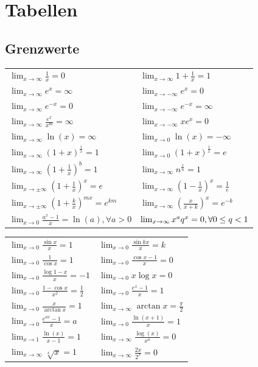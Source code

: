 \documentclass[a4paper,fontsize = 7pt]{scrartcl}
\renewcommand*{\arraystretch}{2}
\def\limxo{\lim_{x\to 0}}
\def\limxi{\lim_{x\to\infty}}
\def\limxn{\lim_{x\to-\infty}}
\begin{document}
\section{Tabellen}
\subsection{Grenzwerte}
\arraycolsep=1pt\def\arraystretch{1.5}
\begin{center}
  \begin{tabularx}{\linewidth}{XX}
    \toprule
    $\limxi \frac{1}{x} = 0$ & $\limxi 1 + \frac{1}{x} = 1$ \\
    $\limxi e^x = \infty$ & $\limxn e^x = 0$ \\
    $\limxi e^{-x} = 0$ & $\limxn e^{-x} = \infty$ \\
    $\limxi \frac{e^x}{x^m} = \infty$ & $\limxn xe^x = 0$ \\
    $\limxi \ln(x) = \infty$ & $\limxo \ln(x) = -\infty$ \\
    $\limxi (1+x)^{\frac{1}{x}} = 1$ & $\limxo (1+x)^{\frac{1}{x}} = e$ \\
    $\limxi (1+\frac{1}{x})^b = 1$ & $\limxi n^{\frac{1}{n}} = 1$ \\
    $\lim_{x\to\pm\infty} (1 + \frac{1}{x})^x = e$ & $\limxi (1-\frac{1}{x})^x = \frac{1}{e}$ \\
    $\lim_{x\to\pm\infty} (1 + \frac{k}{x})^{mx} = e^{km}$ & $\limxi (\frac{x}{x+k})^x = e^{-k}$ \\
    $\limxo \frac{a^x -1}{x} = \ln(a), \forall a > 0$ &
    $\limxi x^a q^x = 0, \newline \forall 0 \le q < 1$ \\
  \end{tabularx}
  \begin{tabularx}{\linewidth}{XX}
    $\limxo \frac{\sin x}{x} = 1$ & $\limxo \frac{\sin kx}{x} = k$\\
    $\limxo \frac{1}{\cos x} = 1$ & $\limxo \frac{\cos x -1}{x} = 0$ \\
    $\limxo \frac{\log 1 - x}{x} = -1$ & $\limxo x \log x = 0$\\
    $\limxo \frac{1 - \cos x}{x^2} = \frac{1}{2}$ & $\limxo \frac{e^x-1}{x} = 1$ \\
    $\limxo \frac{x}{\arctan x} = 1$ & $\limxi \arctan x = \frac{\pi}{2}$ \\
    $\limxo \frac{e^{ax}-1}{x} = a$ & $\limxo \frac{\ln(x+1)}{x} = 1$ \\
    $\lim_{x\to 1} \frac{\ln(x)}{x-1} = 1$ & $\limxi \frac{\log(x)}{x^a} = 0$ \\
    $\limxi \sqrt[x]{x} = 1$ & $\limxi \frac{2x}{2^x} = 0$ \\
    \bottomrule
  \end{tabularx}
\end{center}
\end{document}
